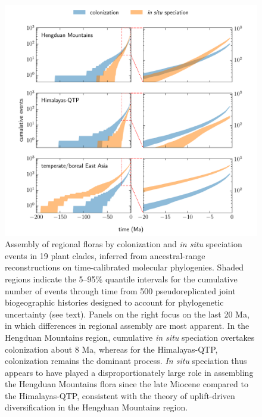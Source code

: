 \documentclass[9pt,twocolumn,twoside,lineno]{pnas-new}
\begin{document}
\begin{figure}
\centering
\includegraphics[width=.99\linewidth]{figures/figure_cumulative_events/figure_cumulative_events.pdf}
\caption{Assembly of regional floras by colonization and \textit{in
    situ} speciation events in 19 plant clades, inferred from
  ancestral-range reconstructions on time-calibrated molecular
  phylogenies. Shaded regions indicate the 5--95\% quantile intervals
  for the cumulative number of events through time from 500
  pseudoreplicated joint biogeographic histories designed to account
  for phylogenetic uncertainty (see text). Panels on the right focus
  on the last 20 Ma, in which differences in regional assembly are
  most apparent. In the Hengduan Mountains region, cumulative
  \textit{in situ} speciation overtakes colonization about 8 Ma,
  whereas for the Himalayas-QTP, colonization remains the dominant
  process. \textit{In situ} speciation thus appears to have played a
  disproportionately large role in assembling the Hengduan Mountains
  flora since the late Miocene compared to the Himalayas-QTP,
  consistent with the theory of uplift-driven diversification in the
  Hengduan Mountains region.}
\label{fig:cumevents}
\end{figure}
\end{document}
